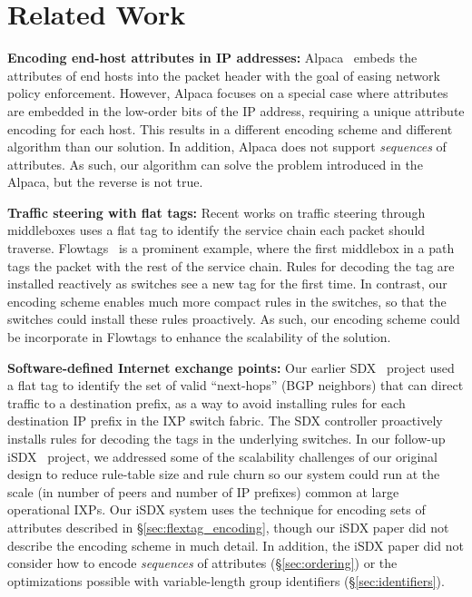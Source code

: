 \section{Related Work} 
\label{sec:related}

\textbf{Encoding end-host attributes in IP addresses:} Alpaca~\cite{alpaca} embeds the attributes of end hosts into the packet header with the goal of easing network policy enforcement.  However, Alpaca focuses on a special case where attributes are embedded in the low-order bits of the IP address, requiring a unique attribute encoding for each host.  This results in a different encoding scheme and different algorithm than our solution.  In addition, Alpaca does not support \emph{sequences} of attributes.  As such, our algorithm can solve the problem introduced in the Alpaca, but the reverse is not true.

\textbf{Traffic steering with flat tags:} Recent works on traffic steering through middleboxes uses a flat tag to identify the service chain each packet should traverse.  Flowtags~\cite{flowtags} is a prominent example, where the first middlebox in a path tags the packet with the rest of the service chain.  Rules for decoding the tag are installed reactively as switches see a new tag for the first time.  In contrast, our encoding scheme enables much more compact rules in the switches, so that the switches could install these rules proactively.  As such, our encoding scheme could be incorporate in Flowtags to enhance the scalability of the solution.

\textbf{Software-defined Internet exchange points:} Our earlier SDX~\cite{sdx} project used a flat tag to identify the set of valid ``next-hops'' (BGP neighbors) that can direct traffic to a destination prefix, as a way to avoid installing rules for each destination IP prefix in the IXP switch fabric.  The SDX controller proactively installs rules for decoding the tags in the underlying switches.  In our follow-up iSDX~\cite{isdx} project, we addressed some of the scalability challenges of our original design to reduce rule-table size and rule churn so our system could run at the scale (in number of peers and number of IP prefixes) common at large operational IXPs.  Our iSDX system uses the technique for encoding sets of attributes described in \S\ref{sec:flextag_encoding}, though our iSDX paper did not describe the encoding scheme in much detail.  In addition, the iSDX paper did not consider how to encode \emph{sequences} of attributes (\S\ref{sec:ordering}) or the optimizations possible with variable-length group identifiers (\S\ref{sec:identifiers}).

